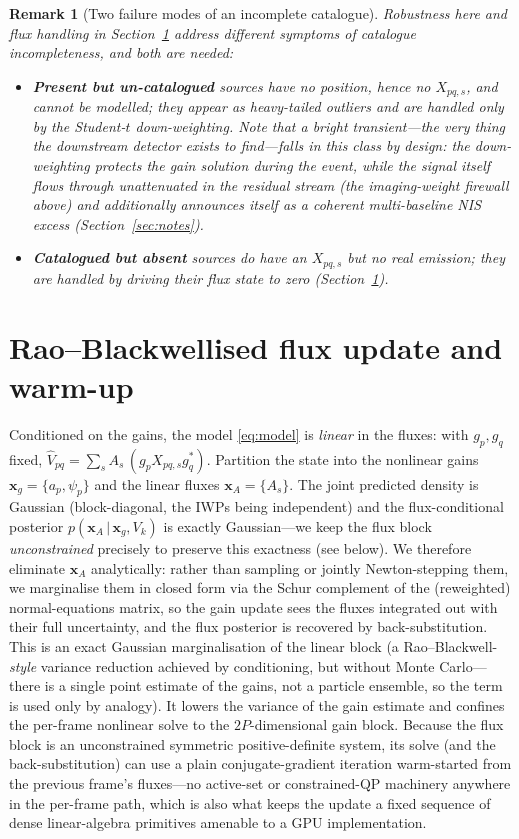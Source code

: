 \documentclass[11pt]{article}
\newtheorem{remark}{Remark}
\newcommand{\given}{\,|\,}
\begin{document}
\begin{remark}[Two failure modes of an incomplete catalogue]
Robustness here and flux handling in Section~\ref{sec:flux} address \emph{different} symptoms of
catalogue incompleteness, and both are needed:
\begin{itemize}[leftmargin=*]
  \item \textbf{Present but un-catalogued} sources have no position, hence no $X_{pq,s}$, and cannot
        be modelled; they appear as heavy-tailed outliers and are handled \emph{only} by the
        Student-$t$ down-weighting. Note that a bright transient---the very thing the downstream
        detector exists to find---falls in this class \emph{by design}: the down-weighting protects
        the gain solution during the event, while the signal itself flows through unattenuated in
        the residual stream (the imaging-weight firewall above) and additionally announces itself
        as a coherent multi-baseline NIS excess (Section~\ref{sec:notes}).
  \item \textbf{Catalogued but absent} sources do have an $X_{pq,s}$ but no real emission; they are
        handled by driving their flux state to zero (Section~\ref{sec:flux}).
\end{itemize}
\end{remark}

\section{Rao--Blackwellised flux update and warm-up}
\label{sec:flux}

Conditioned on the gains, the model \eqref{eq:model} is \emph{linear} in the fluxes: with $g_p,g_q$
fixed, $\hat V_{pq}=\sum_s A_s\,(g_p X_{pq,s} g_q^{\ast})$. Partition the state into the nonlinear
gains $\bm{x}_g=\{a_p,\psi_p\}$ and the linear fluxes $\bm{x}_A=\{A_s\}$. The joint predicted density
is Gaussian (block-diagonal, the IWPs being independent) and the flux-conditional posterior
$p(\bm{x}_A\given\bm{x}_g,V_k)$ is exactly Gaussian---we keep the flux block \emph{unconstrained}
precisely to preserve this exactness (see below). We therefore eliminate $\bm{x}_A$ analytically: rather than sampling or jointly
Newton-stepping them, we marginalise them in closed form via the Schur complement of the
(reweighted) normal-equations matrix, so the gain update sees the fluxes integrated out with their
full uncertainty, and the flux posterior is recovered by back-substitution. This is an exact
Gaussian marginalisation of the linear block (a Rao--Blackwell-\emph{style} variance reduction
achieved by conditioning, but without Monte Carlo---there is a single point estimate of the gains,
not a particle ensemble, so the term is used only by analogy). It lowers the variance of the gain
estimate and confines the per-frame nonlinear solve to the $2P$-dimensional gain block. Because the
flux block is an unconstrained symmetric positive-definite system, its solve (and the
back-substitution) can use a plain conjugate-gradient iteration warm-started from the previous
frame's fluxes---no active-set or constrained-QP machinery anywhere in the per-frame path, which is
also what keeps the update a fixed sequence of dense linear-algebra primitives amenable to a GPU
implementation.
\end{document}
